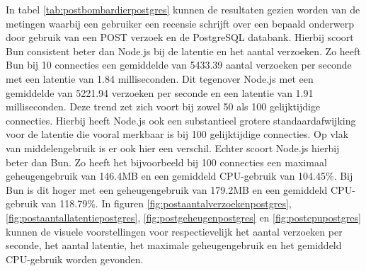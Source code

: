 In tabel \ref{tab:postbombardierpostgres} kunnen de resultaten gezien worden van de metingen waarbij 
een gebruiker een recensie schrijft over een bepaald onderwerp door gebruik van een POST verzoek en de PostgreSQL databank.
Hierbij scoort Bun consistent beter dan Node.js bij de latentie en het aantal verzoeken.
Zo heeft Bun bij 10 connecties een gemiddelde van 5433.39 aantal verzoeken per seconde met een latentie van 1.84 milliseconden. 
Dit tegenover Node.js met een gemiddelde van 5221.94 verzoeken per seconde en een latentie van 1.91 milliseconden.
Deze trend zet zich voort bij zowel 50 als 100 gelijktijdige connecties.
Hierbij heeft Node.js ook een substantieel grotere standaardafwijking voor de latentie die vooral merkbaar is bij 100 gelijktijdige connecties.
Op vlak van middelengebruik is er ook hier een verschil. Echter scoort Node.js hierbij beter dan Bun.
Zo heeft het bijvoorbeeld bij 100 connecties een maximaal geheugengebruik van 146.4MB en een gemiddeld CPU-gebruik van 104.45\%.
Bij Bun is dit hoger met een geheugengebruik van 179.2MB en een gemiddeld CPU-gebruik van 118.79\%.
In figuren \ref{fig:postaantalverzoekenpostgres}, \ref{fig:postaantallatentiepostgres}, \ref{fig:postgeheugenpostgres} en \ref{fig:postcpupostgres} kunnen de visuele voorstellingen 
voor respectievelijk het aantal verzoeken per seconde, het aantal latentie, het maximale geheugengebruik en het gemiddeld CPU-gebruik worden gevonden.
